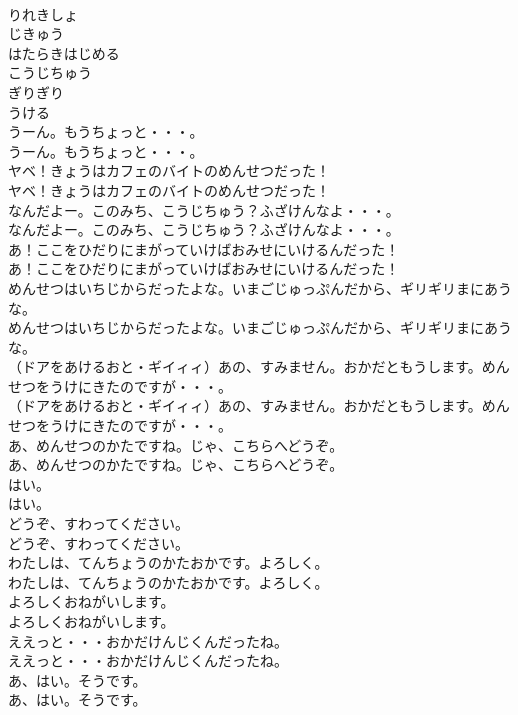 \documentclass[8pt]{extreport}
\begin{document}
\begin{CJK}{UTF8}{min}
\\	りれきしょ
\\	じきゅう
\\	はたらきはじめる
\\	こうじちゅう
\\	ぎりぎり
\\	うける
\\	うーん。もうちょっと・・・。
\\	うーん。もうちょっと・・・。
\\	ヤベ！きょうはカフェのバイトのめんせつだった！
\\	ヤベ！きょうはカフェのバイトのめんせつだった！
\\	なんだよー。このみち、こうじちゅう？ふざけんなよ・・・。
\\	なんだよー。このみち、こうじちゅう？ふざけんなよ・・・。
\\	あ！ここをひだりにまがっていけばおみせにいけるんだった！
\\	あ！ここをひだりにまがっていけばおみせにいけるんだった！
\\	めんせつはいちじからだったよな。いまごじゅっぷんだから、ギリギリまにあうな。
\\	めんせつはいちじからだったよな。いまごじゅっぷんだから、ギリギリまにあうな。
\\	（ドアをあけるおと・ギイィィ）あの、すみません。おかだともうします。めんせつをうけにきたのですが・・・。
\\	（ドアをあけるおと・ギイィィ）あの、すみません。おかだともうします。めんせつをうけにきたのですが・・・。
\\	あ、めんせつのかたですね。じゃ、こちらへどうぞ。
\\	あ、めんせつのかたですね。じゃ、こちらへどうぞ。
\\	はい。
\\	はい。
\\	どうぞ、すわってください。
\\	どうぞ、すわってください。
\\	わたしは、てんちょうのかたおかです。よろしく。
\\	わたしは、てんちょうのかたおかです。よろしく。
\\	よろしくおねがいします。
\\	よろしくおねがいします。
\\	ええっと・・・おかだけんじくんだったね。
\\	ええっと・・・おかだけんじくんだったね。
\\	あ、はい。そうです。
\\	あ、はい。そうです。

\end{CJK}
\end{document}
